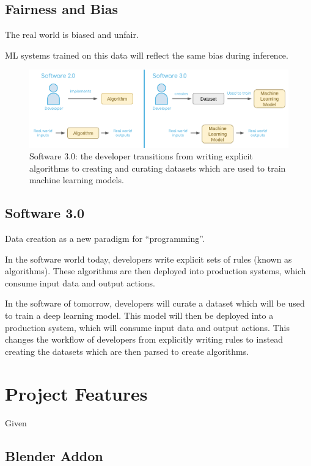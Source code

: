 \documentclass{article}
\begin{document}
\subsection{Fairness and Bias}

The real world is biased and unfair.

ML systems trained on this data will reflect the same bias during inference.

\begin{figure}
	\centering
	\includegraphics[width=\textwidth]{software3.png}
	\caption{Software 3.0: the developer transitions from writing explicit algorithms to creating and curating datasets which are used to train machine learning models.}
	\label{fig:fig2}
\end{figure}

\subsection{Software 3.0}
\label{sec:software3.0}

Data creation as a new paradigm for “programming”.

In the software world today, developers write explicit sets of rules (known as algorithms). These algorithms are then deployed into production systems, which consume input data and output actions.

In the software of tomorrow, developers will curate a dataset which will be used to train a deep learning model. This model will then be deployed into a production system, which will consume input data and output actions. This changes the workflow of developers from explicitly writing rules to instead creating the datasets which are then parsed to create algorithms.

\section{Project Features}
\label{sec:projectfeatures}

Given 

\subsection{Blender Addon}
\label{sec:blenderaddon}
\end{document}
